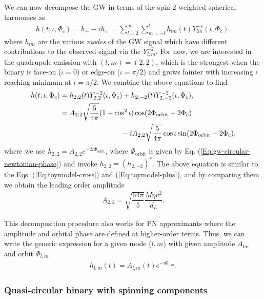We can now decompose the GW in terms of the spin-2 weighted spherical harmonics as
\begin{align}
    h(t;\iota, \Phi_c) = h_{+} - ih_{\times} = \sum_{l=2}^{\infty} \sum_{m=-l}^{l} h_{lm}(t)Y_{lm}^{-s}(\iota, \Phi_c).
\end{align}
where $h_{lm}$ are the various \textit{modes} of the GW signal which have different contributions to the observed signal via the $Y_{l,m}^{-2}$.  For now, we are interested in the quadrupole emission with $(l,m) = (2,2)$, which is the strongest when the binary is face-on ($\iota = 0$) or edge-on ($\iota = \pi/2$)  and grows fainter with increasing $\iota$ reaching minimum at $\iota = \pi/2$. We combine the above equations to find  
\begin{align}
    h(t;\iota,\Phi_c) &= h_{2,2}(t)Y_{2,2}^{-2}(\iota,\Phi_c) + h_{2,-2}(t)Y_{2,-2}^{-2}(\iota,\Phi_c),\\
    &= A_{2,2}\sqrt{\dfrac{5}{4\pi}}(1+\cos^2 \iota)\cos(2\Phi_{\text{orbit}}-2\Phi_c) \notag\\
    & \hspace{3cm} - iA_{2,2}\sqrt{\dfrac{5}{4\pi}}\cos \iota\sin(2\Phi_{\text{orbit}}-2\Phi_c),\label{Eq:spharm-quadrupole}
\end{align}
where we use $h_{2,2} = A_{2,2}e^{-2i\Phi_{\text{orbit}}}$, where $\Phi_{\text{orbit}}$ is given by Eq. (\ref{Eq:gw-circular-newtonian-phase}) and invoke $h_{2,2}=(h_{2,-2})^*$. The above equation is similar to the Eqs. (\ref{Eq:toymodel-cross}) and (\ref{Eq:toymodel-plus}), and by comparing them we obtain the leading order amplitude 
\begin{align}
    A_{2,2} = \sqrt{\dfrac{64\pi}{5}} \dfrac{M\eta v^2}{d_L}. 
\end{align}

This decomposition procedure also works for PN approximants where the amplitude and orbital phase are defined at higher-order terms. Thus, we can write the generic expression for a given mode ($l,m$) with given amplitude $A_{lm}$ and orbit $\Phi_{l,m}$ 
\begin{align}
    h_{l,m}(t) = A_{l,m}(t)e^{-i\Phi_{l,m}}.
\end{align}

 
\subsubsection{Quasi-circular binary with spinning components}\label{sec:precessing-sec}


